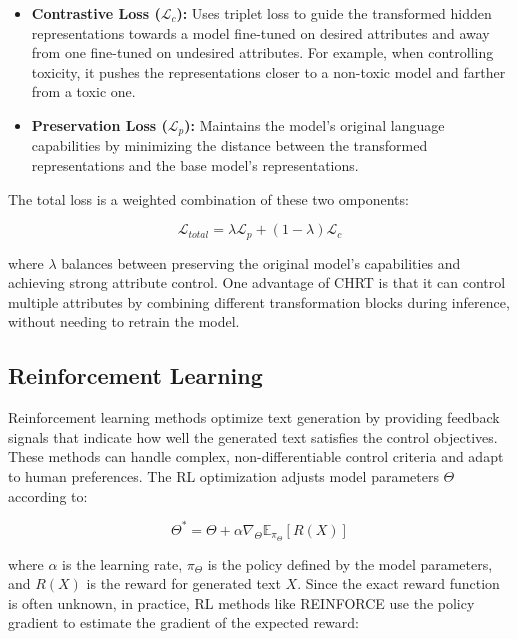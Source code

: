 \begin{itemize}
   \item \textbf{Contrastive Loss ($\mathcal{L}_c$):} Uses triplet loss to guide the transformed hidden representations towards a model fine-tuned on desired attributes and away from one fine-tuned on undesired attributes. For example, when controlling toxicity, it pushes the representations closer to a non-toxic model and farther from a toxic one.
   
   \item \textbf{Preservation Loss ($\mathcal{L}_p$):} Maintains the model's original language capabilities by minimizing the distance between the transformed representations and the base model's representations.
\end{itemize}

The total loss is a weighted combination of these two omponents:

\begin{equation}
    \mathcal{L}_{total} = \lambda\mathcal{L}_p + (1-\lambda)\mathcal{L}_c
\end{equation}

where $\lambda$ balances between preserving the original model's capabilities and achieving strong attribute control. One advantage of CHRT is that it can control multiple attributes by combining different transformation blocks during inference, without needing to retrain the model.

\subsection{Reinforcement Learning}

Reinforcement learning methods optimize text generation by providing feedback signals that indicate how well the generated text satisfies the control objectives. 
These methods can handle complex, non-differentiable control criteria and adapt to human preferences. 
The RL optimization adjusts model parameters $\Theta$ according to:

\begin{equation}
   \Theta^* = \Theta + \alpha\nabla_\Theta \mathbb{E}_{\pi_\Theta}[R(X)]
\end{equation}

where $\alpha$ is the learning rate, $\pi_\Theta$ is the policy defined by the model parameters, and $R(X)$ is the reward for generated text $X$. 
Since the exact reward function is often unknown, in practice, RL methods like REINFORCE \cite{10.1007/BF00992696} use the policy gradient to estimate the gradient of the expected reward:

